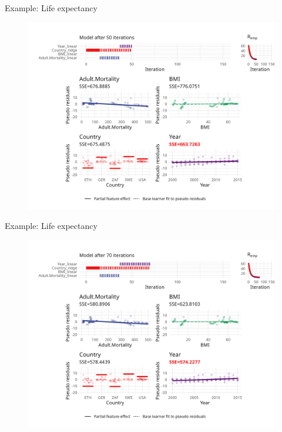 \begin{frame}{Example: Life expectancy}
	\begin{figure}
		\centering
		\includegraphics[width=\textwidth]{figure/cwb-anim/fig-iter-0050.png}
	\end{figure}
	\addtocounter{framenumber}{-1}
\end{frame}


\begin{frame}{Example: Life expectancy}
	\begin{figure}
		\centering
		\includegraphics[width=\textwidth]{figure/cwb-anim/fig-iter-0070.png}
	\end{figure}
	\addtocounter{framenumber}{-1}
\end{frame}


